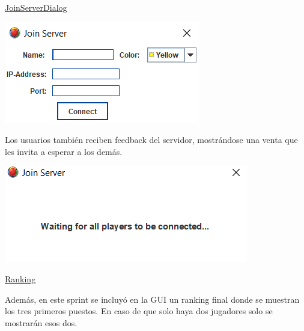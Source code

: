 \documentclass[12pt,a4paper,openright]{book}
\theoremstyle{break}
\begin{document}
\underline{JoinServerDialog}
\begin{center}
\includegraphics[scale=1]{join-server-sprint-6.png}
\end{center}

Los usuarios también reciben feedback del servidor, mostrándose una venta que les invita a esperar a los demás.

\begin{center}
\includegraphics[scale=0.85]{user-feedback.png}
\end{center}

\underline{Ranking}

Además, en este sprint se incluyó en la GUI un ranking final donde se muestran los tres primeros puestos. En caso de que solo haya dos jugadores solo se mostrarán esos dos.
\end{document}
